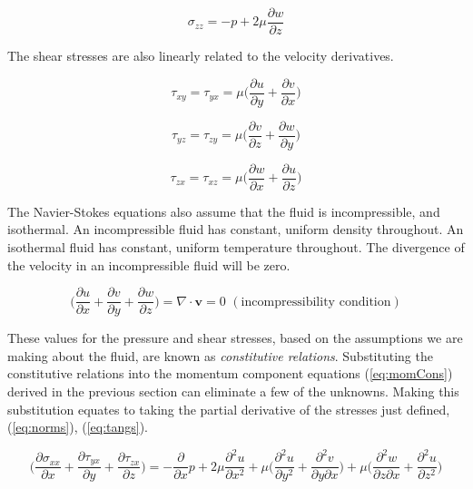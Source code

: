 \documentclass[twocolumn,12pth]{article}
\begin{document}
\begin{equation*}
\sigma_{zz} = -p + 2\mu\frac{\partial{w}}{\partial{z}}
\end{equation*}

The shear stresses are also linearly related to the velocity derivatives.

\begin{equation}
\tau_{xy} = \tau_{yx} = \mu\bigg(\frac{\partial{u}}{\partial{y}} + \frac{\partial{v}}{\partial{x}}\bigg)
\label{eq:tangs}
\end{equation}

\begin{equation*}
\tau_{yz} = \tau_{zy} = \mu\bigg(\frac{\partial{v}}{\partial{z}} + \frac{\partial{w}}{\partial{y}}\bigg)
\end{equation*}

\begin{equation*}
\tau_{zx} = \tau_{xz} = \mu\bigg(\frac{\partial{w}}{\partial{x}} + \frac{\partial{u}}{\partial{z}}\bigg)
\end{equation*}

The Navier-Stokes equations also assume that the fluid is incompressible, and isothermal.
An incompressible fluid has constant, uniform density throughout.
An isothermal fluid has constant, uniform temperature throughout.
The divergence of the velocity in an incompressible fluid will be zero.

\begin{equation}
\bigg( \frac{\partial{u}}{\partial{x}} + \frac{\partial{v}}{\partial{y}} + \frac{\partial{w}}{\partial{z}}  \bigg) = \nabla \cdot  \mathbf{v} = 0 \,\, (\mathrm{incompressibility \,\, condition})
\label{eq:ic}
\end{equation}

These values for the pressure and shear stresses, based on the assumptions we are making about the fluid, are known as \textit{constitutive relations}.
Substituting the constitutive relations into the momentum component equations (\ref{eq:momCons}) derived in the previous section can eliminate a few of the unknowns.
Making this substitution equates to taking the partial derivative of the stresses just defined, (\ref{eq:norms}), (\ref{eq:tangs}).

\begin{equation}
\bigg(\frac{\partial{\sigma_{xx}}}{\partial{x}} + \frac{\partial{\tau_{yx}}}{\partial{y}} + \frac{\partial{\tau_{zx}}}{\partial{z}} \bigg) = -\frac{\partial}{\partial{x}}p + 2\mu\frac{\partial^2u}{\partial{x}^2} + \mu\bigg(\frac{\partial^2u}{\partial{y}^2} + \frac{\partial^2v}{\partial{y}\partial{x}} \bigg) + \mu\bigg(\frac{\partial^2w}{\partial{z}\partial{x}} + \frac{\partial^2u}{\partial{z}^2} \bigg)
\end{equation}
\end{document}
